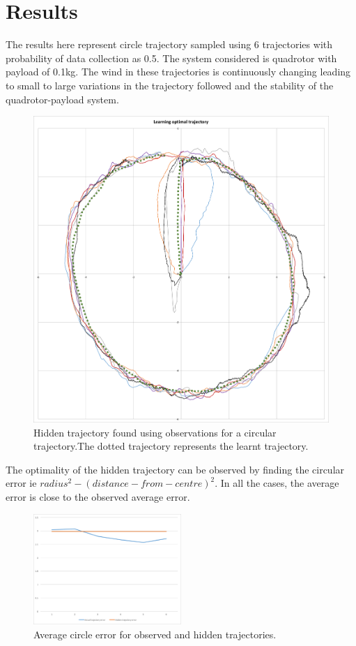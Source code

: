 \documentclass[hidelinks,BTech]{iitmdiss}
\begin{document}
\section{Results}
The results here represent circle trajectory sampled using 6 trajectories with probability of data collection as 0.5. The system considered is quadrotor with payload of 0.1kg. The wind in these trajectories is continuously changing leading to small to large variations in the trajectory followed and the stability of the quadrotor-payload system. 

\begin{figure}[H]
  \centering
    \includegraphics[width=\textwidth]{Apprenticeship_hidden_trajectory.png}
    \caption{Hidden trajectory found using observations for a circular trajectory.The dotted trajectory represents the learnt trajectory.}
\end{figure}

The optimality of the hidden trajectory can be observed by finding the circular error ie $radius^2 - (distance-from-centre)^2$. In all the cases, the average error is close to the observed average error.
\begin{figure}[H]
  \centering
    \includegraphics[width=0.5\textwidth]{Apprenticeship_optimality_graph.png}
    \caption{Average circle error for observed and hidden trajectories.}
\end{figure}	
\end{document}
